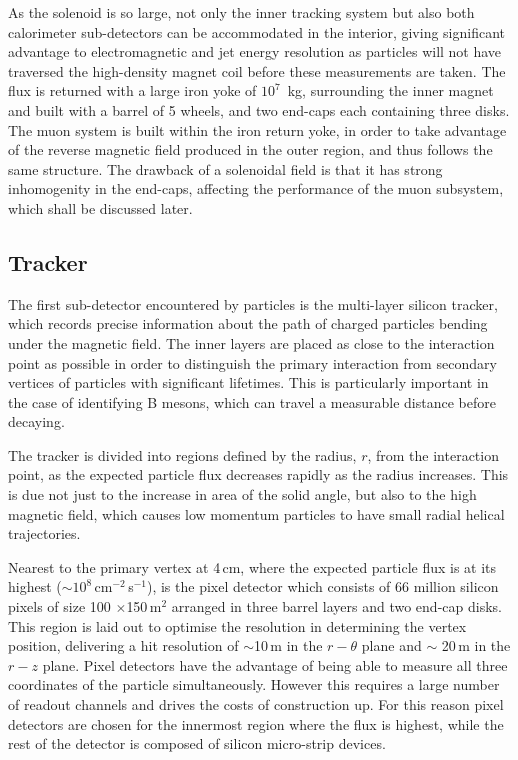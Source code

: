 As the solenoid is so large, not only the inner tracking system but also both calorimeter sub-detectors can be accommodated in the interior, giving significant advantage to electromagnetic and jet energy resolution as particles will not have traversed the high-density magnet coil before these measurements are taken. The flux is returned with a large iron yoke of $10^{7}$~kg, surrounding the inner magnet and built with a barrel of 5 wheels, and two end-caps each containing three disks. The muon system is built within the iron return yoke, in order to take advantage of the reverse magnetic field produced in the outer region, and thus follows the same structure. The drawback of a solenoidal field is that it has strong inhomogenity in the end-caps, affecting the performance of the muon subsystem, which shall be discussed later.


\subsection{Tracker}



The first sub-detector encountered by particles is the multi-layer silicon tracker, which records precise information about the path of charged particles bending under the magnetic field. The inner layers are placed as close to the interaction point as possible in order to distinguish the primary interaction from secondary vertices of particles with significant lifetimes. This is particularly important in the case of identifying B mesons, which can travel a measurable distance before decaying.  

The tracker is divided into regions defined by the radius, $r$, from the interaction point, as the expected particle flux decreases rapidly as the radius increases. This is due not just to the increase in area of the solid angle, but also to the high magnetic field, which causes low momentum particles to have small radial helical trajectories.

Nearest to the primary vertex at 4\,cm, where the expected particle flux is at its highest ($\sim10^{8}$\,cm$^{-2}$\,s$^{-1}$), is the pixel detector which consists of 66 million silicon pixels of size 100 $\times$150\,\textmu m$^{2}$ arranged in three barrel layers and two end-cap disks. This region is laid out to optimise the resolution in determining the vertex position, delivering a hit resolution of $\sim$10\,\textmu m in the $r-\theta$ plane and $\sim$ 20\,\textmu m in the $r - z$ plane. Pixel detectors have the advantage of being able to measure all three coordinates of the particle simultaneously. However this requires a large number of readout channels and drives the costs of construction up. For this reason pixel detectors are chosen for the innermost region where the flux is highest, while the rest of the detector is composed of silicon micro-strip devices. 

